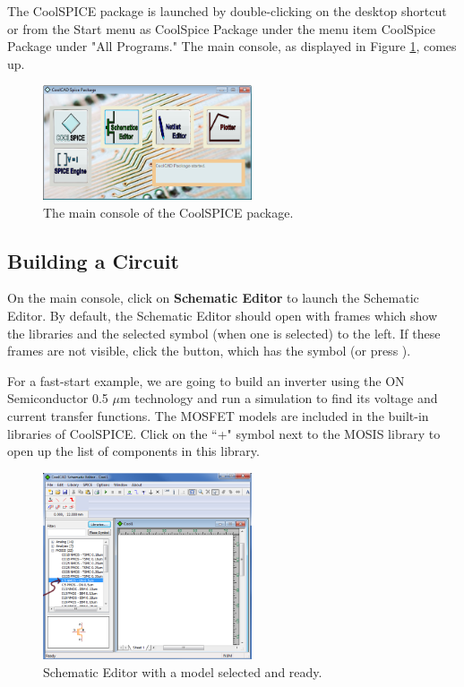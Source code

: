 The CoolSPICE package is launched by double-clicking on the desktop shortcut or from the Start menu as \textsf{CoolSpice Package}  under the menu item \textsf{CoolSpice Package} under "All Programs."  The main console, as displayed in Figure \ref{fig_mainconsole}, comes up.  

\begin{figure}
    \includegraphics[width=0.55\textwidth]{./figures/getting_started_figures/CoolSPICE_mainconsole.png}
	\caption{{The main console of the CoolSPICE package.}}
  \label{fig_mainconsole}
\end{figure}


\subsection{Building a Circuit}

On the main console, click on \textbf{Schematic Editor} to launch the Schematic Editor. By default, the Schematic Editor should open with frames which show the libraries and the selected symbol (when one is selected) to the left.  If these frames are not visible, click the  button, which has the symbol \fbox{$\Omega$} (or press ).  

For a fast-start example, we are going to build an inverter using the ON Semiconductor 0.5 $\mu$m technology and run a simulation to find its voltage and current transfer functions.  The MOSFET models are included in the built-in libraries of CoolSPICE.  Click on the ``+" symbol next to the MOSIS library to open up the list of components in this library.

\begin{figure}
    \includegraphics[width=0.55\textwidth]{./figures/getting_started_figures/CoolSPICE_emptySchematicEditor.png}
    \caption{{Schematic Editor with a model selected and ready.}}
  \label{fig_emptyschematiceditor}
\end{figure}

